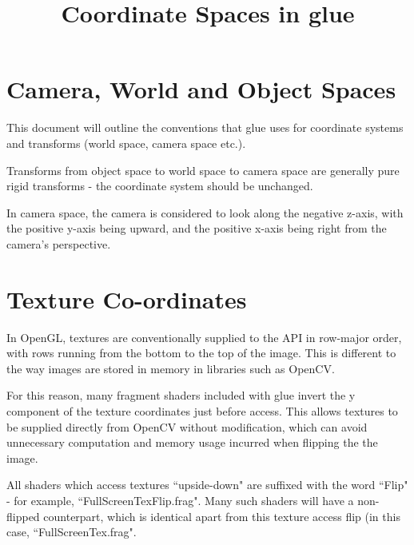\documentclass{article}
\title{Coordinate Spaces in glue}
\begin{document}
\maketitle

\section{Camera, World and Object Spaces}

This document will outline the conventions that glue uses for coordinate systems and transforms (world space, camera space etc.).

Transforms from object space to world space to camera space are generally pure rigid transforms - the coordinate system should be unchanged.

In camera space, the camera is considered to look along the negative z-axis, with the positive y-axis being upward, and the positive x-axis being right from the camera's perspective.

\section{Texture Co-ordinates}

In OpenGL, textures are conventionally supplied to the API in row-major order, with rows running from the bottom to the top of the image. This is different to the way images are stored in memory in libraries such as OpenCV.

For this reason, many fragment shaders included with glue invert the y component of the texture coordinates just before access. This allows textures to be supplied directly from OpenCV without modification, which can avoid unnecessary computation and memory usage incurred when flipping the the image.

All shaders which access textures ``upside-down" are suffixed with the word ``Flip" - for example, ``FullScreenTexFlip.frag". Many such shaders will have a non-flipped counterpart, which is identical apart from this texture access flip (in this case, ``FullScreenTex.frag".
\end{document}
